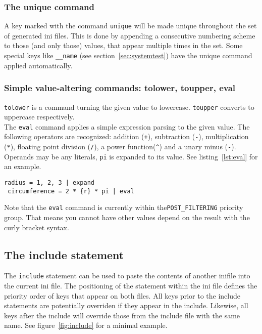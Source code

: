 \documentclass[11pt]{article}
\begin{document}
\subsubsection{The unique command}

A key marked with the command \lstinline!unique! will be made unique throughout the set of generated ini files. This is done by appending a consecutive numbering scheme to those (and only those) values, that appear multiple times in the set. Some special keys like \lstinline!__name! (see section~\ref{sec:systemtest}) have the unique command applied automatically.

\subsubsection{Simple value-altering commands: tolower, toupper, eval}

\lstinline!tolower! is a command turning the given value to lowercase. \lstinline!toupper! converts to uppercase respectively. \\

The \lstinline!eval! command applies a simple expression parsing to the given value. The following operators are recognized: addition (\lstinline!+!), subtraction (\lstinline!-!), multiplication (\lstinline!*!), floating point division (\lstinline!/!), a power function(\lstinline!^!) and a unary minus (\lstinline!-!). Operands may be any literals, \lstinline!pi! is expanded to its value. See listing~\ref{lst:eval} for an example.

\begin{lstlisting}[caption={An example of the eval command},label=lst:eval]
 radius = 1, 2, 3 | expand
 circumference = 2 * {r} * pi | eval
\end{lstlisting}

Note that the \lstinline!eval! command is currently within the\lstinline!POST_FILTERING! priority group. That means you cannot have other values depend on the result with the curly bracket syntax.

\subsection{The include statement}
The \lstinline!include! statement can be used to paste the contents of another inifile into the current ini file. The positioning of the statement within the ini file defines the priority order of keys that appear on both files. All keys prior to the include statements are potentially overriden if they appear in the include. Likewise, all keys after the include will override those from the include file with the same name. See figure~\ref{fig:include} for a minimal example. \\
\end{document}
